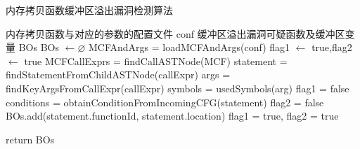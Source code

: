 {\begin{algorithm}
	\renewcommand{\algorithmicrequire}{\textbf{Input:}}
	\renewcommand{\algorithmicensure}{\textbf{Output:}}
	\caption{内存拷贝函数缓冲区溢出漏洞检测算法}
	\label{内存拷贝函数缓冲区溢出漏洞检测算法}
	\begin{algorithmic}[1]
		\REQUIRE 内存拷贝函数与对应的参数的配置文件 conf
		\ENSURE 缓冲区溢出漏洞可疑函数及缓冲区变量 BOs
		\STATE BOs $\leftarrow \varnothing$
		\STATE MCFAndArgs = loadMCFAndArgs(conf)
		\STATE flag1 $\leftarrow$ true,flag2 $\leftarrow$ true
			\STATE MCFCallExprs = findCallASTNode(MCF)
				\STATE statement = findStatementFromChildASTNode(callExpr)
				\STATE args = findKeyArgsFromCallExpr(callExpr)
					\STATE symbols = usedSymbols(arg)
						\STATE flag1 = false
					\ENDIF
					\STATE conditions = obtainConditionFromIncomingCFG(statement)
							\STATE flag2 = false
						\ENDIF
					\ENDFOR
				\ENDFOR
					\STATE BOs.add(statement.functionId, statement.location)
				\ENDIF
				\STATE flag1 = true, flag2 = true
			\ENDFOR
		\ENDFOR
		
	\STATE return BOs	
	\end{algorithmic}
\end{algorithm}

}
